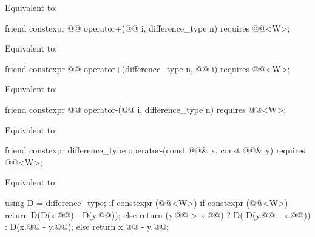 \begin{itemdescr}
\pnum
\effects
Equivalent to: 
\end{itemdescr}

\begin{itemdecl}
friend constexpr @@ operator+(@@ i, difference_type n)
  requires @@<W>;
\end{itemdecl}

\begin{itemdescr}
\pnum
\effects
Equivalent to: 
\end{itemdescr}

\begin{itemdecl}
friend constexpr @@ operator+(difference_type n, @@ i)
  requires @@<W>;
\end{itemdecl}

\begin{itemdescr}
\pnum
\effects
Equivalent to: 
\end{itemdescr}

\begin{itemdecl}
friend constexpr @@ operator-(@@ i, difference_type n)
  requires @@<W>;
\end{itemdecl}

\begin{itemdescr}
\pnum
\effects
Equivalent to: 
\end{itemdescr}

\begin{itemdecl}
friend constexpr difference_type operator-(const @@& x, const @@& y)
  requires @@<W>;
\end{itemdecl}

\begin{itemdescr}
\pnum
\effects
Equivalent to:
\begin{codeblock}
using D = difference_type;
if constexpr (@@<W>) {
  if constexpr (@@<W>)
    return D(D(x.@@) - D(y.@@));
  else
    return (y.@@ > x.@@)
      ? D(-D(y.@@ - x.@@))
      : D(x.@@ - y.@@);
} else {
  return x.@@ - y.@@;
}
\end{codeblock}
\end{itemdescr}

